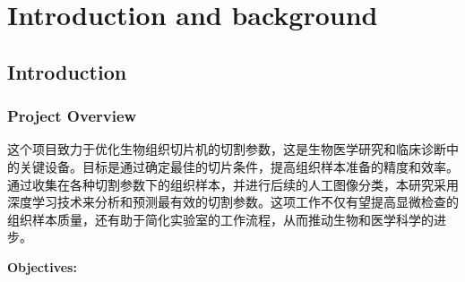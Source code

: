 \section{Introduction and background}
\label{sec:introduction}


\subsection{Introduction}

\subsubsection{Project Overview}

这个项目致力于优化生物组织切片机的切割参数，这是生物医学研究和临床诊断中的关键设备。目标是通过确定最佳的切片条件，提高组织样本准备的精度和效率。通过收集在各种切割参数下的组织样本，并进行后续的人工图像分类，本研究采用深度学习技术来分析和预测最有效的切割参数。这项工作不仅有望提高显微检查的组织样本质量，还有助于简化实验室的工作流程，从而推动生物和医学科学的进步。


\textbf{Objectives:}

